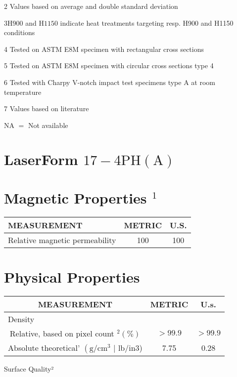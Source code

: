 \documentclass[10pt]{article}
\begin{document}
2 Values based on average and double standard deviation

$3 \mathrm{H} 900$ and $\mathrm{H} 1150$ indicate heat treatments targeting resp. H900 and H1150 conditions

4 Tested on ASTM E8M specimen with rectangular cross sections

5 Tested on ASTM E8M specimen with circular cross sections type 4

6 Tested with Charpy V-notch impact test specimens type A at room temperature

7 Values based on literature

NA $=$ Not available

\section*{LaserForm $17-4 \mathrm{PH}(\mathrm{A})$ }
\section*{Magnetic Properties ${ }^{1}$}
\begin{center}
\begin{tabular}{|lcc|}
\hline
MEASUREMENT & METRIC & U.S. \\
\hline
Relative magnetic permeability & 100 & 100 \\
\hline
\end{tabular}
\end{center}

\section*{Physical Properties}
\begin{center}
\begin{tabular}{|c|c|c|}
\hline
MEASUREMENT & METRIC & U.s. \\
\hline
\multicolumn{3}{|l|}{Density} \\
\hline
Relative, based on pixel count ${ }^{2}(\%)$ & $>99.9$ & $>99.9$ \\
\hline
Absolute theoretical' $\left(\mathrm{g} / \mathrm{cm}^{3}\right.$ | lb/in3) & 7.75 & 0.28 \\
\hline
\end{tabular}
\end{center}

Surface Quality²
\end{document}
